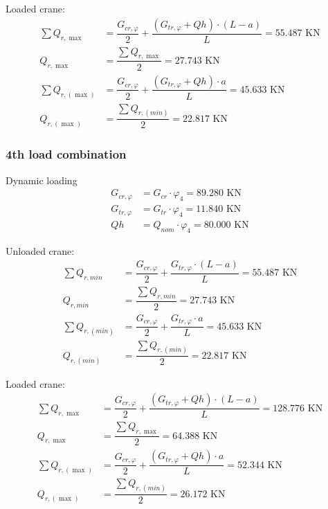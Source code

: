 \documentclass[a4paper,10pt, final, oneside, fleqn, onecolumn]{article}	%
\begin{document}
Loaded crane:
\begin{align*}
    \sum{Q_{r,\max}}     &= \dfrac{G_{cr,φ}}{2} + \dfrac{(G_{tr,φ} + Qh) \cdot (L - a)}{L} = 55.487 \text{ KN} \\
    Q_{r,\max}           &= \dfrac{\displaystyle\sum{Q_{r,\max}}}{2}                       = 27.743  \text{ KN} \\
    \sum{Q_{r,(\max)}}   &= \dfrac{G_{cr,φ}}{2} + \dfrac{(G_{tr,φ} + Qh) \cdot a}{L}       = 45.633 \text{ KN} \\
    Q_{r,(\max)}         &= \dfrac{\displaystyle\sum{Q_{r,(min)}}}{2}                      = 22.817 \text{ KN}
\end{align*}

\subsubsection{4th load combination}

Dynamic loading
\begin{align*}
    G_{cr,φ} &= G_{cr} \cdot φ_4  = 89.280 \text{ KN} \\
    G_{tr,φ} &= G_{tr} \cdot φ_4  = 11.840 \text{ KN} \\
    Qh       &= Q_{nom} \cdot φ_4 = 80.000   \text{ KN}
\end{align*}

Unloaded crane:
\begin{align*}
    \sum{Q_{r,min}}   &= \dfrac{G_{cr,φ}}{2} + \dfrac{G_{tr,φ} \cdot (L - a)}{L} = 55.487 \text{ KN} \\
    Q_{r,min}         &= \dfrac{\displaystyle\sum{Q_{r,min}}}{2}                 = 27.743  \text{ KN} \\
    \sum{Q_{r,(min)}} &= \dfrac{G_{cr,φ}}{2} + \dfrac{G_{tr,φ} \cdot a}{L}       = 45.633 \text{ KN} \\
    Q_{r,(min)}       &= \dfrac{\displaystyle\sum{Q_{r,(min)}}}{2}               = 22.817  \text{ KN}
\end{align*}

Loaded crane:
\begin{align*}
    \sum{Q_{r,\max}}     &= \dfrac{G_{cr,φ}}{2} + \dfrac{(G_{tr,φ} + Qh) \cdot (L - a)}{L} = 128.776 \text{ KN} \\
    Q_{r,\max}           &= \dfrac{\displaystyle\sum{Q_{r,\max}}}{2}                       = 64.388  \text{ KN} \\
    \sum{Q_{r,(\max)}}   &= \dfrac{G_{cr,φ}}{2} + \dfrac{(G_{tr,φ} + Qh) \cdot a}{L}       = 52.344 \text{ KN} \\
    Q_{r,(\max)}         &= \dfrac{\displaystyle\sum{Q_{r,(min)}}}{2}                      = 26.172 \text{ KN}
\end{align*}
\end{document}
